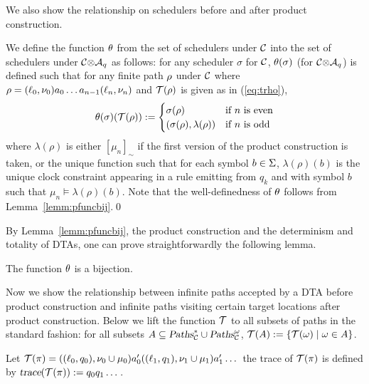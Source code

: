 
We also show the relationship on schedulers before and after product construction.

We define the function $\theta$ from the set of schedulers under $\mathcal{C}$ into the set of schedulers under ${\mathcal{C}}{\otimes}{\mathcal{A}_q}$ as follows: for any scheduler $\sigma$ for $\mathcal{C}$, $\theta(\sigma)$ (for ${\mathcal{C}}{\otimes}{\mathcal{A}_q}$) is defined such that for any finite path $\rho$ under $\mathcal{C}$ where $\rho=(\ell_0,\nu_0)a_0\dots a_{n-1}(\ell_n,\nu_n)$ and $\mathcal{T}(\rho)$ is given as in (\ref{eq:trho}),
\[
\theta(\sigma)(\mathcal{T}(\rho)):=
\begin{cases}
\sigma(\rho) & \mbox{if }n\mbox{ is even} \\
(\sigma(\rho),\lambda(\rho)) & \mbox{if }n\mbox{ is odd}
\end{cases}
\]
where $\lambda(\rho)$ is either $\left[\mu_n\right]_\sim$ if the first version of the product construction is taken, or
the unique function such that for each symbol $b\in\Sigma$, $\lambda(\rho)(b)$ is the unique clock constraint appearing in a rule emitting from $q_k$ and with symbol $b$ such that $\mu_n\models\lambda(\rho)(b)$.
Note that the well-definedness of $\theta$ follows from Lemma~\ref{lemm:pfuncbij}.\qed

By Lemma~\ref{lemm:pfuncbij}, the product construction and the determinism and totality of DTAs, one can prove straightforwardly the following lemma.
\vspace{-0.8em}
\begin{lemma}\label{lemm:sfuncbij}
The function $\theta$ is a bijection.
\end{lemma}
\vspace{-0.8em}
Now we show the relationship between infinite paths accepted by a DTA before product construction and infinite paths visiting certain target locations after product construction.
Below we lift the function $\mathcal{T}$ to all subsets of paths in the standard fashion: for all subsets $A\subseteq \mbox{\sl Paths}^*_{\mathcal{C}}\cup\mbox{\sl Paths}^\omega_{\mathcal{C}}$, $\mathcal{T}(A):=\{\mathcal{T}(\omega)\mid \omega\in A\}$.

\begin{definition}[Traces]
Let 
$ \mathcal{T}(\pi) = 
    ((\ell_0,q_0),\nu_0\cup\mu_0)
    a'_0
    ((\ell_1,q_1),\nu_1\cup\mu_1)
    a'_1
    \dots 
$
the trace of $ \mathcal{T} ( \pi ) $ is defined by
$\mbox{\sl trace}(  \mathcal{T} ( \pi )  ) := q_0 q_1 \dots $.
\end{definition}

